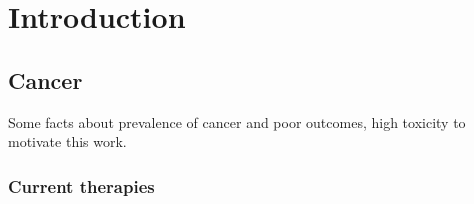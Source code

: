 
\chapter{Introduction}
\label{ch:Introduction}

\section{Cancer}

Some facts about prevalence of cancer and poor outcomes, high toxicity to motivate this work.

\subsection{Current therapies}

